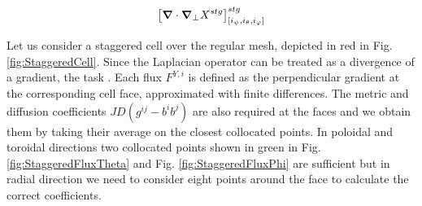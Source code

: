 \begin{equation}
	\left[\grad\cdot\grad_{\perp}X^{stg}\right]^{stg}_{[i_\psi,i_\theta, i_\varphi]}
\end{equation}

Let us consider a staggered cell over the regular mesh, depicted in red in Fig. \ref{fig:StaggeredCell}. Since the Laplacian operator can be treated as a divergence of a gradient, the task . Each flux $F^{Y,i}$ is defined as the perpendicular gradient at the corresponding cell face, approximated with finite differences. The metric and diffusion coefficients $JD(g^{ij}-b^ib^j)$ are also required at the faces and we obtain them by taking their average on the closest collocated points. In poloidal and toroidal directions two collocated points shown in green in Fig. \ref{fig:StaggeredFluxTheta} and Fig. \ref{fig:StaggeredFluxPhi} are sufficient but in radial direction we need to consider eight points around the face to calculate the correct coefficients. \\

